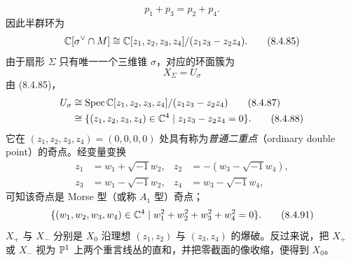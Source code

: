 \begin{equation}
  p_1+p_3=p_2+p_4. \tag{8.4.84}
\end{equation}
因此半群环为
\begin{equation}
  \mathbb{C}[\sigma^\vee\cap M]\cong\mathbb{C}[z_1,z_2,z_3,z_4]/(z_1z_3-z_2z_4). \tag{8.4.85}
\end{equation}
由于扇形 $\Sigma$ 只有唯一一个三维锥 $\sigma$，对应的环面簇为
\begin{equation}
  X_\Sigma=U_\sigma \tag{8.4.86}
\end{equation}
由 (8.4.85)，
\begin{align}
  U_\sigma&\cong\operatorname{Spec}\mathbb{C}[z_1,z_2,z_3,z_4]/(z_1z_3-z_2z_4) \tag{8.4.87}\\
  &\cong\{(z_1,z_2,z_3,z_4)\in\mathbb{C}^4\mid z_1z_3-z_2z_4=0\}. \tag{8.4.88}
\end{align}
它在 $(z_1,z_2,z_3,z_4)=(0,0,0,0)$ 处具有称为\emph{普通二重点}（ordinary double point）的奇点。经变量变换
\begin{align}
  z_1&=w_1+\sqrt{-1}w_2, & z_2&=-(w_3-\sqrt{-1}w_4), \tag{8.4.89}\\
  z_3&=w_1-\sqrt{-1}w_2, & z_4&=w_3-\sqrt{-1}w_4, \tag{8.4.90}
\end{align}
可知该奇点是 Morse 型（或称 $A_1$ 型）奇点；
\begin{equation}
  \{(w_1,w_2,w_3,w_4)\in\mathbb{C}^4\mid w_1^2+w_2^2+w_3^2+w_4^2=0\}. \tag{8.4.91}
\end{equation}
$X_+$ 与 $X_-$ 分别是 $X_0$ 沿理想 $(z_1,z_2)$ 与 $(z_3,z_4)$ 的爆破。反过来说，把 $X_+$ 或 $X_-$ 视为 $\mathbb{P}^1$ 上两个重言线丛的直和，并把零截面的像收缩，便得到 $X_0$。


